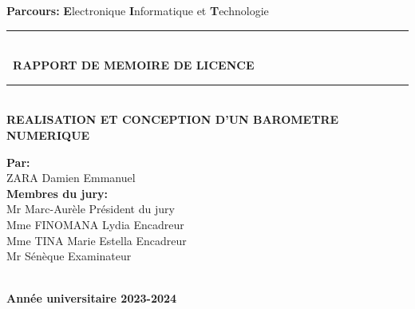 \documentclass[a4paper,12pt]{report}
\begin{document}
\begin{titlepage}
\begin{center}
\textsc{\Large}
{\large \bfseries Parcours: }
{\large \textbf{E}lectronique \textbf{I}nformatique et \textbf{T}echnologie }\\[1cm]




\rule{\linewidth}{0.2mm} \\[0.4cm]
{ \bfseries\ RAPPORT DE MEMOIRE DE LICENCE \\[0.1cm] }
\rule{\linewidth}{0.2mm} \\[2.5cm]



\textsc{\huge}
{\huge \bfseries\color{blue} REALISATION ET CONCEPTION D'UN BAROMETRE NUMERIQUE  \\[2.5cm] }



\begin{minipage}{0.8\textwidth}
  \begin{flushleft} \large
    \large \textbf{Par:}\\
    \setlength{\indent}
    \textsc{ZARA} Damien Emmanuel \\[1cm]
    \large \textbf{Membres du jury:}\\
    \setlength{\indent}Mr Marc-Aurèle  \hspace{5cm}Président du jury \\
   \setlength{\indent}Mme FINOMANA Lydia  \hspace{4cm}Encadreur \\
   \setlength{\indent}Mme TINA Marie Estella   \hspace{4cm}Encadreur\\
   \setlength{\indent}Mr Sénèque   \hspace{6.5cm}Examinateur\\
    	
  \end{flushleft}
\end{minipage}%
\begin{minipage}{0.8\textwidth}
  
 \end{minipage}\\[2.3cm]  %



{\textbf{\large {Année universitaire} 2023-2024}}

\end{center}
\end{titlepage}


\end{document}
